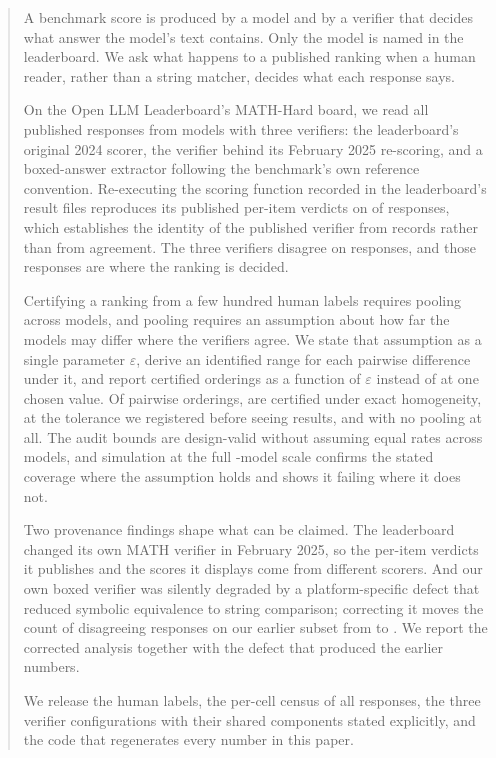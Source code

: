 
\begin{abstract}
A benchmark score is produced by a model and by a verifier that decides what answer the
model's text contains. Only the model is named in the leaderboard. We ask what happens to a
published ranking when a human reader, rather than a string matcher, decides what each
response says.

On the Open LLM Leaderboard's MATH-Hard board, we read all \NumRows{} published responses
from \NumModels{} models with three verifiers: the leaderboard's original 2024 scorer, the
verifier behind its February 2025 re-scoring, and a boxed-answer extractor following the
benchmark's own reference convention. Re-executing the scoring function recorded in the
leaderboard's result files reproduces its published per-item verdicts on \EmReexecItems{} of
\EmReexecItems{} responses, which establishes the identity of the published verifier from
records rather than from agreement. The three verifiers disagree on \RowsAnyDisagree{}
responses, and those responses are where the ranking is decided.

Certifying a ranking from a few hundred human labels requires pooling across models, and
pooling requires an assumption about how far the models may differ where the verifiers agree.
We state that assumption as a single parameter $\varepsilon$, derive an identified range for
each pairwise difference under it, and report certified orderings as a function of
$\varepsilon$ instead of at one chosen value. Of \NumOrderings{} pairwise orderings,
\CertEpsZero{} are certified under exact homogeneity, \CertPrereg{} at the tolerance we
registered before seeing results, and \CertNoPooling{} with no pooling at all. The audit
bounds are design-valid without assuming equal rates across models, and simulation at the
full \NumModels{}-model scale confirms the stated coverage where the assumption holds and
shows it failing where it does not.

Two provenance findings shape what can be claimed. The leaderboard changed its own MATH
verifier in February 2025, so the per-item verdicts it publishes and the scores it displays
come from different scorers. And our own boxed verifier was silently degraded by a
platform-specific defect that reduced symbolic equivalence to string comparison; correcting
it moves the count of disagreeing responses on our earlier subset from
\DisagreeSbEmSeventeenString{} to \DisagreeSbEmSeventeen{}. We report the corrected analysis
together with the defect that produced the earlier numbers.

We release the human labels, the per-cell census of all \NumRows{} responses, the three
verifier configurations with their shared components stated explicitly, and the code that
regenerates every number in this paper.
\end{abstract}
